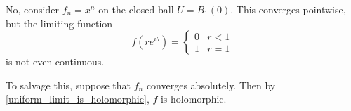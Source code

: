 \documentclass{homework}
\begin{document}
                                                                                                                                                                                                                                                                                                                                                                      \begin{solution}
                                                                                                                                                                                                                                                                                                                                                                      No, consider $f_n = x^n$ on the closed ball $U = B_{1}(0)$. This converges pointwise, but the limiting function 
                                                                                                                                                                                                                                                                                                                                                                      \[f(re^{i\theta}) = \begin{cases} 0 & r<1\\ 1 & r=1 \end{cases}\]
                                                                                                                                                                                                                                                                                                                                                                      is not even continuous. 

                                                                                                                                                                                                                                                                                                                                                                      To salvage this, suppose that $f_n$ converges absolutely. Then by \ref{uniform_limit_is_holomorphic}, $f$ is holomorphic.
                                                                                                                                                                                                                                                                                                                                                                      \end{solution}
\end{document}
